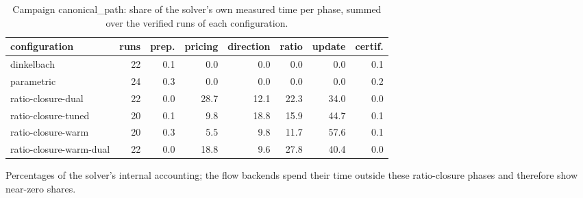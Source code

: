 \begin{table}[tbp]
\centering
\caption{Campaign canonical\_path: share of the solver's own measured time per phase, summed over the verified runs of each configuration.}
\label{tab:canonical_path-breakdown}
\small
\begin{adjustbox}{max width=\textwidth}
\begin{tabular}{lrrrrrrr}
\toprule
configuration & runs & prep. & pricing & direction & ratio & update & certif. \\
\midrule
dinkelbach & 22 & 0.1 & 0.0 & 0.0 & 0.0 & 0.0 & 0.1 \\
parametric & 24 & 0.3 & 0.0 & 0.0 & 0.0 & 0.0 & 0.2 \\
ratio-closure-dual & 22 & 0.0 & 28.7 & 12.1 & 22.3 & 34.0 & 0.0 \\
ratio-closure-tuned & 20 & 0.1 & 9.8 & 18.8 & 15.9 & 44.7 & 0.1 \\
ratio-closure-warm & 20 & 0.3 & 5.5 & 9.8 & 11.7 & 57.6 & 0.1 \\
ratio-closure-warm-dual & 22 & 0.0 & 18.8 & 9.6 & 27.8 & 40.4 & 0.0 \\
\bottomrule
\end{tabular}
\end{adjustbox}
\par\vspace{2pt}\footnotesize Percentages of the solver's internal accounting; the flow backends spend their time outside these ratio-closure phases and therefore show near-zero shares.
\end{table}
